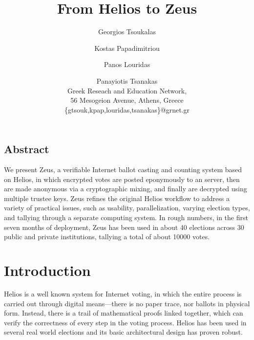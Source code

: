 \documentclass[letterpaper,twocolumn,10pt]{article}
\begin{document}
\date{}

\title{\Large \bf From Helios to Zeus}

\author{
{\rm Georgios Tsoukalas}\\
\and 
{\rm Kostas Papadimitriou}\\
\and 
{\rm Panos Louridas}\\
\and 
{\rm Panayiotis Tsanakas}\\
Greek Reseach and Education Network,\\
56 Mesogeion Avenue, Athens, Greece\\
\{gtsouk,kpap,louridas,tsanakas\}@grnet.gr
}

\maketitle

\thispagestyle{empty}

\subsection*{Abstract}

We present Zeus, a verifiable Internet ballot casting and counting
system based on Helios, in which encrypted votes are posted eponymously
to an server, then are made anonymous via a cryptographic mixing, and
finally are decrypted using multiple trustee keys. Zeus refines the
original Helios workflow to address a variety of practical issues, such
as usability, parallelization, varying election types, and tallying
through a separate computing system.
In rough numbers, in the first seven months of deployment, Zeus has been
used in about 40 elections across 30 public and private institutions,
tallying a total of about 10000 votes.


\section{Introduction}

Helios \cite{HeliosOriginal} \cite{Helios3} is a well known system for
Internet voting, in which the entire process is carried out through
digital means---there is no paper trace, nor ballots in physical form.
Instead, there is a trail of mathematical proofs linked together, which
can verify the correctness of every step in the voting process.
Helios has been used in several real world elections and its basic
architectural design has proven robust.
\end{document}
